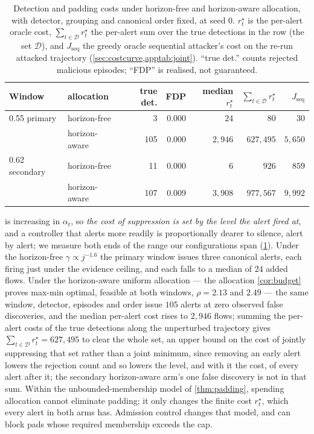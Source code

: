 \documentclass[conference]{IEEEtran}
\newcommand{\alphat}{\alpha_t}
\begin{document}
\begin{table}[t]
\centering
\caption{Detection and padding costs under horizon-free and horizon-aware allocation, with detector,
grouping and canonical order fixed, at seed 0. $r^{\star}_t$ is the per-alert oracle cost,
$\sum_{t\in\mathcal D} r^{\star}_t$ the per-alert sum over the true detections in the row (the set
$\mathcal D$), and $J_{\mathrm{seq}}$ the greedy oracle
sequential attacker's cost on the re-run attacked trajectory (\cref{sec:costcurve,apptab:joint}).
``true det.'' counts rejected malicious episodes; ``FDP'' is realised, not guaranteed.}
\label{tab:costcurve}
\footnotesize
\setlength{\tabcolsep}{8pt}
\begin{tabular}{@{}llrrrrr@{}}
\toprule
Window & allocation & true det. & FDP & median $r^{\star}_t$ & $\sum_{t\in\mathcal D} r^{\star}_t$ & $J_{\mathrm{seq}}$ \\
\midrule
0.55 primary & horizon-free & 3 & 0.000 & $24$ & $80$ & $30$ \\
\quad & horizon-aware & 105 & 0.000 & $2{,}946$ & $627{,}495$ & $5{,}650$ \\
\midrule
0.62 secondary & horizon-free & 11 & 0.000 & $6$ & $926$ & $859$ \\
\quad & horizon-aware & 107 & 0.009 & $3{,}908$ & $977{,}567$ & $9{,}992$ \\
\bottomrule
\end{tabular}
\end{table}

 is increasing in $\alphat$, so \emph{the cost of suppression is set by the level the
alert fired at}, and a controller that alerts more readily is proportionally dearer to silence, alert
by alert; we measure both ends of the range our configurations span (\cref{tab:costcurve}). Under
the horizon-free $\gamma\propto j^{-1.6}$ the primary window issues three canonical alerts, each firing
just under the evidence ceiling, and each falls to a median of $24$ added flows. Under the
horizon-aware uniform allocation --- the allocation \cref{cor:budget} proves max-min optimal, feasible
at both windows, $\rho=2.13$ and $2.49$ --- the same window, detector, episodes and order issue $105$
alerts at zero observed false discoveries, and the median per-alert cost rises to $2{,}946$ flows;
summing the per-alert costs of the true detections along the unperturbed trajectory gives
$\sum_{t\in\mathcal D} r^{\star}_t=627{,}495$ to clear the whole set, an upper bound on the cost of jointly suppressing
that set rather than a joint minimum, since removing an early alert lowers the rejection count and so
lowers the level, and with it the cost, of every alert after it; the secondary horizon-aware arm's
one false discovery is not in that sum. Within the unbounded-membership model of \cref{thm:padding},
spending allocation cannot eliminate padding; it only changes the finite cost $r^{\star}_t$, which
every alert in both arms has. Admission control changes that model, and can
block pads whose required membership exceeds the cap.
\end{document}
